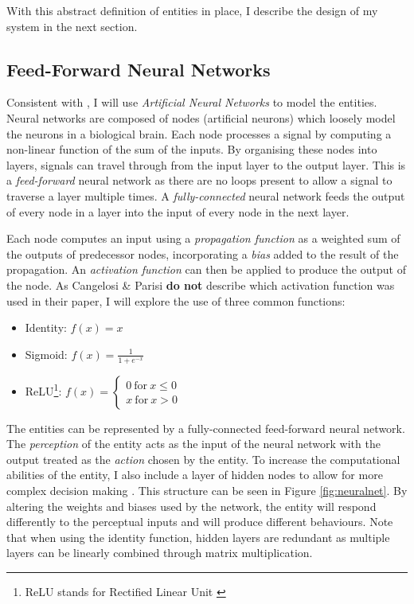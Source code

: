 \documentclass[12pt,a4paper,twoside,openright]{report}
\begin{document}
With this abstract definition of entities in place, I describe the design of my system in the next section.

\subsection{Feed-Forward Neural Networks}\label{section:neural}

Consistent with \citet{Cangelosi1998}, I will use \emph{Artificial Neural Networks} to model the entities. Neural networks are composed of nodes (artificial neurons) which loosely model the neurons in a biological brain. Each node processes a signal by computing a non-linear function of the sum of the inputs. By organising these nodes into layers, signals can travel through from the input layer to the output layer. This is a \emph{feed-forward} neural network as there are no loops present to allow a signal to traverse a layer multiple times. A \emph{fully-connected} neural network feeds the output of every node in a layer into the input of every node in the next layer. 

Each node computes an input using a \emph{propagation function} as a weighted sum of the outputs of predecessor nodes, incorporating a \emph{bias} added to the result of the propagation. An \emph{activation function} can then be applied to produce the output of the node. As Cangelosi \& Parisi {\bf do not} describe which activation function was used in their paper, I will explore the use of three common functions:

\begin{itemize}
	\item Identity: $f(x) = x$
	\item Sigmoid: $f(x) = \frac{1}{1+e^{-x}}$
	\item ReLU\footnote{ReLU stands for Rectified Linear Unit \citep{nair2010rectified}}:	$ f(x) = 
    \left\{
        \begin{array}{ll}
          0~\mathrm{for}~x \leq 0 \\
          x~\mathrm{for}~x > 0
        \end{array}
      \right.
      $
\end{itemize}

The entities can be represented by a fully-connected feed-forward neural network. The  \emph{perception} of the entity acts as the input of the neural network with the output treated as the \emph{action} chosen by the entity. To increase the computational abilities of the entity, I also include a layer of hidden nodes to allow for more complex decision making \citep{de1993backpropagation}. This structure can be seen in Figure \ref{fig:neuralnet}. By altering the weights and biases used by the network, the entity will respond differently to the perceptual inputs and will produce different behaviours. Note that when using the identity function, hidden layers are redundant as multiple layers can be linearly combined through matrix multiplication.
\end{document}
